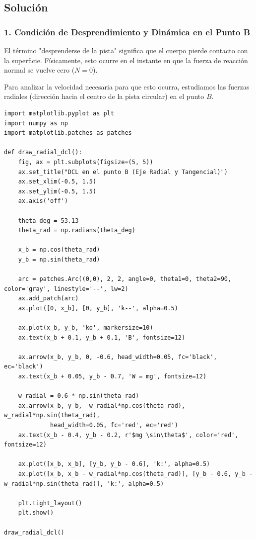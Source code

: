 \documentclass[12pt, a4paper]{article}
\begin{document}
\subsection*{Solución}

\subsubsection*{1. Condición de Desprendimiento y Dinámica en el Punto B}
El término "desprenderse de la pista" significa que el cuerpo pierde contacto con la superficie. Físicamente, esto ocurre en el instante en que la fuerza de reacción normal se vuelve cero ($N = 0$).

Para analizar la velocidad necesaria para que esto ocurra, estudiamos las fuerzas radiales (dirección hacia el centro de la pista circular) en el punto $B$.

\begin{lstlisting}
import matplotlib.pyplot as plt
import numpy as np
import matplotlib.patches as patches

def draw_radial_dcl():
    fig, ax = plt.subplots(figsize=(5, 5))
    ax.set_title("DCL en el punto B (Eje Radial y Tangencial)")
    ax.set_xlim(-0.5, 1.5)
    ax.set_ylim(-0.5, 1.5)
    ax.axis('off')
    
    theta_deg = 53.13
    theta_rad = np.radians(theta_deg)
    
    x_b = np.cos(theta_rad)
    y_b = np.sin(theta_rad)
    
    arc = patches.Arc((0,0), 2, 2, angle=0, theta1=0, theta2=90, color='gray', linestyle='--', lw=2)
    ax.add_patch(arc)
    ax.plot([0, x_b], [0, y_b], 'k--', alpha=0.5)
    
    ax.plot(x_b, y_b, 'ko', markersize=10)
    ax.text(x_b + 0.1, y_b + 0.1, 'B', fontsize=12)
    
    ax.arrow(x_b, y_b, 0, -0.6, head_width=0.05, fc='black', ec='black')
    ax.text(x_b + 0.05, y_b - 0.7, 'W = mg', fontsize=12)
    
    w_radial = 0.6 * np.sin(theta_rad)
    ax.arrow(x_b, y_b, -w_radial*np.cos(theta_rad), -w_radial*np.sin(theta_rad), 
             head_width=0.05, fc='red', ec='red')
    ax.text(x_b - 0.4, y_b - 0.2, r'$mg \sin\theta$', color='red', fontsize=12)
    
    ax.plot([x_b, x_b], [y_b, y_b - 0.6], 'k:', alpha=0.5)
    ax.plot([x_b, x_b - w_radial*np.cos(theta_rad)], [y_b - 0.6, y_b - w_radial*np.sin(theta_rad)], 'k:', alpha=0.5)

    plt.tight_layout()
    plt.show()

draw_radial_dcl()
\end{lstlisting}
\end{document}
